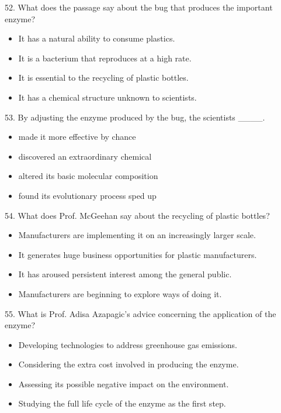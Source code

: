 \documentclass[UTF8,11pt]{ctexart}
\begin{document}
52. What does the passage say about the bug that produces the important enzyme?


\begin{itemize}[leftmargin=2em,itemsep=.2em,topsep=.4em]\item[A.] It has a natural ability to consume plastics.
\item[B.] It is a bacterium that reproduces at a high rate.
\item[C.] It is essential to the recycling of plastic bottles.
\item[D.] It has a chemical structure unknown to scientists.
\end{itemize}

53. By adjusting the enzyme produced by the bug, the scientists \_\_\_\_.


\begin{itemize}[leftmargin=2em,itemsep=.2em,topsep=.4em]\item[A.] made it more effective by chance
\item[B.] discovered an extraordinary chemical
\item[C.] altered its basic molecular composition
\item[D.] found its evolutionary process sped up
\end{itemize}

54. What does Prof. McGeehan say about the recycling of plastic bottles?


\begin{itemize}[leftmargin=2em,itemsep=.2em,topsep=.4em]\item[A.] Manufacturers are implementing it on an increasingly larger scale.
\item[B.] It generates huge business opportunities for plastic manufacturers.
\item[C.] It has aroused persistent interest among the general public.
\item[D.] Manufacturers are beginning to explore ways of doing it.
\end{itemize}

55. What is Prof. Adisa Azapagic’s advice concerning the application of the enzyme?


\begin{itemize}[leftmargin=2em,itemsep=.2em,topsep=.4em]\item[A.] Developing technologies to address greenhouse gas emissions.
\item[B.] Considering the extra cost involved in producing the enzyme.
\item[C.] Assessing its possible negative impact on the environment.
\item[D.] Studying the full life cycle of the enzyme as the first step.
\end{itemize}
\end{document}

